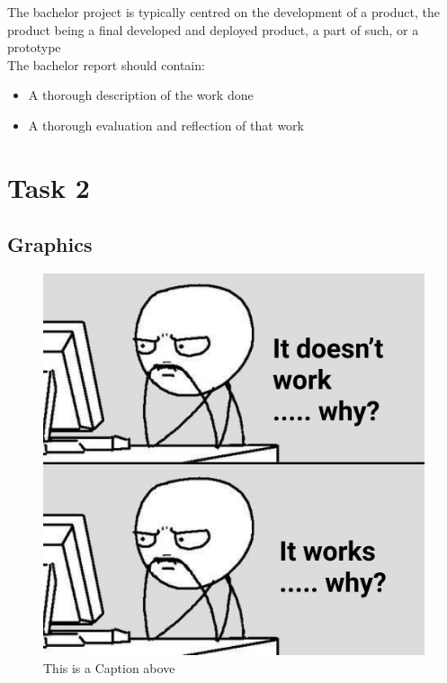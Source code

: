 \documentclass[12pt]{article}
\begin{document}
The bachelor project is typically centred on the
development of a product, the product being a
final developed and deployed product, a part of
such, or a prototype\\

The bachelor report should contain:
\begin{itemize}
\item A thorough description of the work done
\item A thorough evaluation and reflection of that work
\end{itemize}

\section{Task 2}
\subsection{Graphics}


\begin{figure}[H]
  \caption{This is a Caption above \label{figure:cap-above}}
  \includegraphics[width=\textwidth]{img}
\end{figure}
\end{document}
